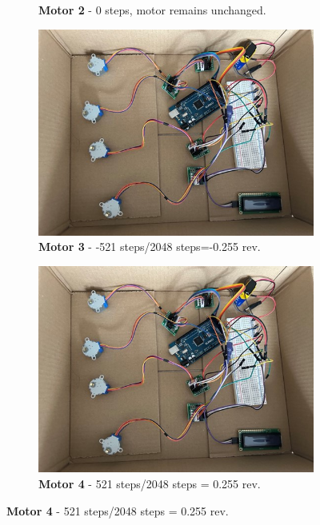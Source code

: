 \begin{figure}[H]
\begin{subfigure}{0.45\textwidth}
        \caption{\centering \textbf{Motor 2} - 0 steps, motor remains unchanged.}
    \end{subfigure}
    \begin{subfigure}{0.45\textwidth} %
        \centering
        \includegraphics[width=\linewidth]{Image/Result/example.jpg}
        \caption{\centering \textbf{Motor 3} - -521 steps/2048 steps=-0.255 rev.}
    \end{subfigure}
    \hfill
    \begin{subfigure}{0.45\textwidth} %
        \centering
        \includegraphics[width=\linewidth]{Image/Result/example.jpg}
        \caption{\centering \textbf{Motor 4} - 521 steps/2048 steps = 0.255 rev.}

\end{subfigure}
\end{figure}
